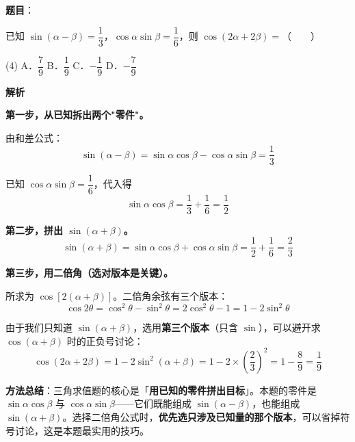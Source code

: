\begin{answer}

\textbf{题目}：

已知 $\sin(\alpha-\beta)=\dfrac13$，$\cos\alpha\sin\beta=\dfrac16$，则 $\cos(2\alpha+2\beta)=$\mbox{（　　）}

\begin{gkopts}(4)
\task A．$\dfrac79$
\task B．$\dfrac19$
\task C．$-\dfrac19$
\task D．$-\dfrac79$
\end{gkopts}

\textbf{解析}

\textbf{第一步，从已知拆出两个"零件"。}

由和差公式：
\nopagebreak[4]
\[\sin(\alpha-\beta)=\sin\alpha\cos\beta-\cos\alpha\sin\beta=\frac13\]

已知 $\cos\alpha\sin\beta=\dfrac16$，代入得
\nopagebreak[4]
\[\sin\alpha\cos\beta=\frac13+\frac16=\frac12\]

\textbf{第二步，拼出 $\sin(\alpha+\beta)$。}
\nopagebreak[4]
\[\sin(\alpha+\beta)=\sin\alpha\cos\beta+\cos\alpha\sin\beta=\frac12+\frac16=\frac23\]

\textbf{第三步，用二倍角（选对版本是关键）。}

所求为 $\cos\left[2(\alpha+\beta)\right]$。二倍角余弦有三个版本：
\nopagebreak[4]
\[\cos2\theta=\cos^{2}\theta-\sin^{2}\theta=2\cos^{2}\theta-1=1-2\sin^{2}\theta\]

由于我们只知道 $\sin(\alpha+\beta)$，选用\textbf{第三个版本}（只含 $\sin$），可以避开求 $\cos(\alpha+\beta)$ 时的正负号讨论：
\nopagebreak[4]
\[\cos(2\alpha+2\beta)=1-2\sin^{2}(\alpha+\beta)=1-2\times\left(\frac23\right)^{2}=1-\frac89=\frac19\]

\begin{gktip}
\textbf{方法总结}：三角求值题的核心是「\textbf{用已知的零件拼出目标}」。本题的零件是 $\sin\alpha\cos\beta$ 与 $\cos\alpha\sin\beta$——它们既能组成 $\sin(\alpha-\beta)$，也能组成 $\sin(\alpha+\beta)$。选择二倍角公式时，\textbf{优先选只涉及已知量的那个版本}，可以省掉符号讨论，这是本题最实用的技巧。
\end{gktip}


\par\medskip

\end{answer}

